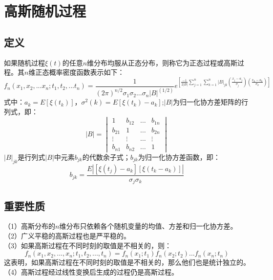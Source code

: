 \documentclass[12pt,a4paper,oneside]{ctexart}
\begin{document}
\section{高斯随机过程}
\subsection{定义}
如果随机过程$\xi(t)$的任意$n$维分布均服从正态分布，则称它为正态过程或高斯过程。其$n$维正态概率密度函数表示如下：
$$
   f_{n}(x_{1},x_{2},...x_{n};t_{1},t_{2},...t_{n}) = \frac{1}{(2\pi)^{n/2}\sigma_{1}\sigma_{2}...\sigma_{n}|B|^(1/2)}e^{\left[\frac{-1}{2|B|}  {\textstyle \sum_{j=1}^{n}}  {\textstyle \sum_{k=1}^{n}}|B|_{jk}(\frac{x_{j} - a_{j}}{\sigma _{j}})(\frac{x_{k}-a_{k}}{\sigma_{k} } )\right]}
$$
式中：$a_{k} = E\left[\xi(t_{k})\right]$，$\sigma^{2}(k) = E\left[\xi(t_{k}) - a_{k}\right]$;$|B|$为归一化协方差矩阵的行列式，即：
$$
   |B| = \begin{vmatrix}
    1 & b_{12}& \dots   &b_{1n} \\
    b_{21} &1 & \dots  & b_{2n} \\
     \vdots &\vdots  &\dots  &\vdots \\
     b_{n1}&b_{n2}  &\dots  &1
   \end{vmatrix}  
$$
$|B|_{jk}$是行列式$|B|$中元素$b_{jk}$的代数余子式；$b_{jk}$为归一化协方差函数，即：
$$
   b_{jk} = \frac{E|\left[\xi(t_{j}) - a_{k}\right]\left[\xi(t_{k} - a_{k})\right]|}{\sigma_{j}\sigma_{k}}
$$
\subsection{重要性质}

\noindent（1）高斯分布的$n$维分布只依赖各个随机变量的均值、方差和归一化协方差。\\
（2）广义平稳的高斯过程也是严平稳的。\\
（3）如果高斯过程在不同时刻的取值是不相关的，则：
$$
   f_{n}(x_{1},x_{2},...,x_{n};t_{1},t_{2},...,t_{n}) = f_{n}(x_{1};t_{1})f_{n}(x_{2};t_{2})...f_{n}(x_{n};t_{n})
$$
这表明，如果高斯过程在不同时刻的取值是不相关的，那么他们也是统计独立的。\\
（4）高斯过程经过线性变换后生成的过程仍是高斯过程。
\end{document}
